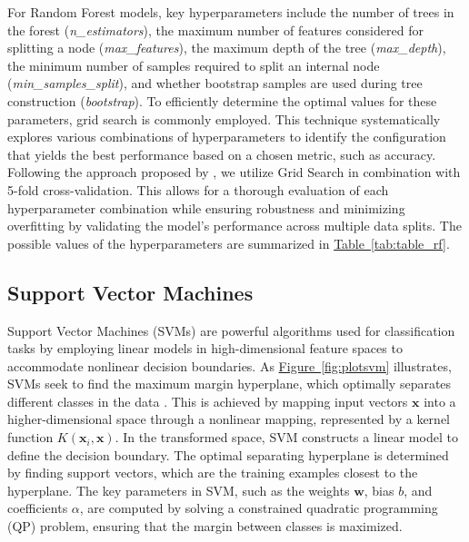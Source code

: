 \documentclass[aodsor,preprint]{imsart}
\numberwithin{equation}{section}
\theoremstyle{plain}
\begin{document}
For Random Forest models, key hyperparameters include the number of trees in the forest (\textit{n\_estimators}), the maximum number of features considered for splitting a node (\textit{max\_features}), the maximum depth of the tree (\textit{max\_depth}), the minimum number of samples required to split an internal node (\textit{min\_samples\_split}), and whether bootstrap samples are used during tree construction (\textit{bootstrap}). To efficiently determine the optimal values for these parameters, grid search is commonly employed. This technique systematically explores various combinations of hyperparameters to identify the configuration that yields the best performance based on a chosen metric, such as accuracy. Following the approach proposed by \cite{shynkevich2017}, we utilize Grid Search in combination with 5-fold cross-validation. This allows for a thorough evaluation of each hyperparameter combination while ensuring robustness and minimizing overfitting by validating the model's performance across multiple data splits. The possible values of the hyperparameters are summarized in \hyperref[tab:table_rf]{Table~\ref*{tab:table_rf}}.





\subsection{Support Vector Machines}
\label{sec:Sub}

Support Vector Machines (SVMs) are powerful algorithms used for classification tasks by employing linear models in high-dimensional feature spaces to accommodate nonlinear decision boundaries. As \hyperref[fig:plotsvm]{Figure~\ref*{fig:plotsvm}} illustrates, SVMs seek to find the maximum margin hyperplane, which optimally separates different classes in the data \cite{kim2003}. This is achieved by mapping input vectors $\mathbf{x}$ into a higher-dimensional space through a nonlinear mapping, represented by a kernel function $K(\mathbf{x}_i, \mathbf{x})$. In the transformed space, SVM constructs a linear model to define the decision boundary. The optimal separating hyperplane is determined by finding support vectors, which are the training examples closest to the hyperplane. The key parameters in SVM, such as the weights $\mathbf{w}$, bias $b$, and coefficients $\alpha$, are computed by solving a constrained quadratic programming (QP) problem, ensuring that the margin between classes is maximized.
\end{document}
